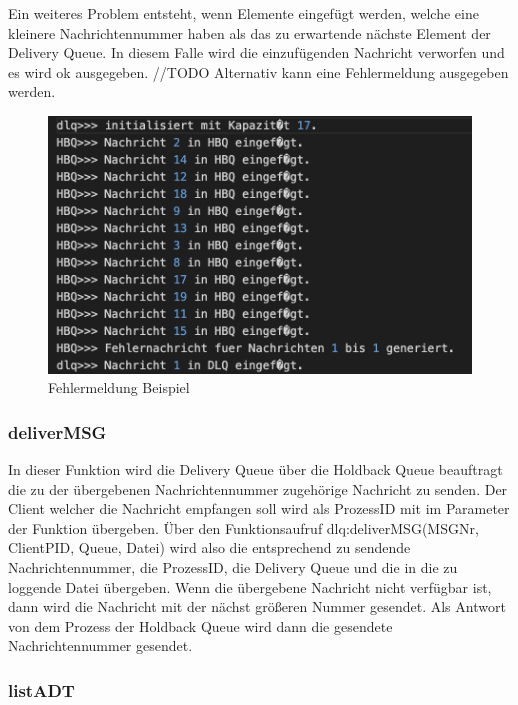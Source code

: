 Ein weiteres Problem entsteht, wenn Elemente eingefügt werden, welche eine kleinere Nachrichtennummer haben als das zu erwartende nächste Element der Delivery Queue. In diesem Falle wird die einzufügenden Nachricht verworfen und es wird ok ausgegeben.
//TODO Alternativ kann eine Fehlermeldung ausgegeben werden. 



\begin{figure}[htbp]
\begin{center}
\includegraphics[scale=0.6]{Bilder/BeispielHBQFehler}
\caption{\label{fig:BeispielHBQFehler} Fehlermeldung Beispiel \cite{HBQfehler}} 
\end{center}
\end{figure}

\subsubsection{deliverMSG}

In dieser Funktion wird die Delivery Queue über die Holdback Queue beauftragt die zu der übergebenen Nachrichtennummer zugehörige Nachricht zu senden. Der Client welcher die Nachricht empfangen soll wird als ProzessID mit im Parameter der Funktion übergeben. 
Über den Funktionsaufruf dlq:deliverMSG(MSGNr, ClientPID, Queue, Datei) wird also die entsprechend zu sendende Nachrichtennummer, die ProzessID, die Delivery Queue und die in die zu loggende Datei übergeben. 
Wenn die übergebene Nachricht nicht verfügbar ist, dann wird die Nachricht mit der nächst größeren Nummer gesendet. 
Als Antwort von dem Prozess der Holdback Queue wird dann die gesendete Nachrichtennummer gesendet. 

\subsubsection{listADT}

